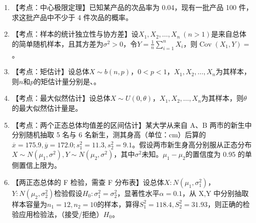 \documentclass[fontset=exam]{exam-zh}
\begin{document}

\par{}\smallskip

\begin{enumerate}
\def\labelenumi{\arabic{enumi}.}
\item
  【考点：中心极限定理】已知某产品的次品率为 0.04，现有一批产品 100 件，求这批产品中不少于 4 件次品的概率\underline{\hspace{2cm}}。
\item
  【考点：样本的统计独立性与协方差】设\(X_1,X_2,\ldots,X_n\ (n>1)\)是来自总体的简单随机样本，且其方差为\(\sigma^2>0\)，令\(Y=\frac1n\sum_{i=1}^nX_i\)，则\(\operatorname{Cov}(X_1,Y)=\)\underline{\hspace{2cm}}。
\item
  【考点：矩估计】设总体\(X\sim b(n,p)\)，\(0<p<1\)，\(X_1,X_2,\ldots,X_n\)为其样本，则\(n\)和\(p\)的矩估计量分别是\underline{\hspace{2cm}}、\underline{\hspace{2cm}}。
\item
  【考点：最大似然估计】设总体\(X\sim U(0,\theta)\)，\(X_1,X_2,\ldots,X_n\)为其样本，则\(\theta\)的最大似然估计量是\underline{\hspace{2cm}}。
\item
  【考点：两个正态总体均值差的区间估计】某大学从来自 A、B 两市的新生中分别随机抽取 5 名与 6 名新生，测其身高（单位：cm）后算的\(\overline x=175.9,\overline y=172.0;s_1^2=11.3,s_2^2=9.1\)。假设两市新生身高分别服从正态分布\(X\sim N(\mu_1,\sigma^2),Y\sim N(\mu_2,\sigma^2)\)，其中\(\sigma^2\)未知。\(\mu_1-\mu_2\)的置信度为 0.95 的单侧置信上限为\underline{\hspace{2cm}}。
\item
  【两正态总体的 F 检验，需查 F 分布表】设总体\(X:N(\mu_1,\sigma_1^2)\)，\(Y:N(\mu_2,\sigma_2^2)\)检验假设\(H_0:\sigma_1^2=\sigma_2^2\)，显著性水平\(\alpha=0.1\)，从 X,Y 中分别抽取样本容量为\(n_1=12,n_2=10\)的样本，算得\(S_1^2=118.4,S_2^2=31.93\)，则正确的检验应用\underline{\hspace{2cm}}检验法，\underline{\hspace{2cm}}（接受/拒绝）\(H_0\)。
\end{enumerate}

\end{document}
